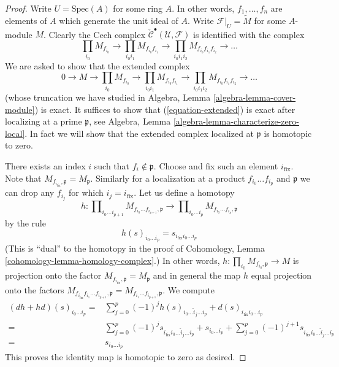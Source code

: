 \begin{proof}
Write $U = \text{Spec}(A)$ for some ring $A$.
In other words, $f_1, \ldots, f_n$ are elements of $A$
which generate the unit ideal of $A$.
Write $\mathcal{F}|_U = \widetilde{M}$ for some $A$-module $M$.
Clearly the Cech complex
$\check{\mathcal{C}}^\bullet(\mathcal{U}, \mathcal{F})$
is identified with the complex
$$
\prod_{i_0} M_{f_{i_0}} \to
\prod_{i_0i_1} M_{f_{i_0}f_{i_1}} \to
\prod_{i_0i_1i_2} M_{f_{i_0}f_{i_1}f_{i_2}} \to
\ldots
$$
We are asked to show that the extended complex
\begin{equation}
\label{equation-extended}
0 \to
M \to
\prod_{i_0} M_{f_{i_0}} \to
\prod_{i_0i_1} M_{f_{i_0}f_{i_1}} \to
\prod_{i_0i_1i_2} M_{f_{i_0}f_{i_1}f_{i_2}} \to
\ldots
\end{equation}
(whose truncation we have studied in
Algebra, Lemma \ref{algebra-lemma-cover-module}) is exact.
It suffices to show that (\ref{equation-extended})
is exact after localizing at a prime $\mathfrak p$, see
Algebra, Lemma \ref{algebra-lemma-characterize-zero-local}.
In fact we will show that the extended complex localized
at $\mathfrak p$ is homotopic to zero.

\medskip\noindent
There exists an index $i$ such that $f_i \not \in \mathfrak p$.
Choose and fix such an element $i_{\text{fix}}$. Note that
$M_{f_{i_{\text{fix}}}, \mathfrak p} = M_{\mathfrak p}$. Similarly
for a localization at a product $f_{i_0} \ldots f_{i_p}$ and $\mathfrak p$
we can drop any $f_{i_j}$ for which $i_j = i_{\text{fix}}$.
Let us define a homotopy
$$
h :
\prod\nolimits_{i_0 \ldots i_{p + 1}}
M_{f_{i_0} \ldots f_{i_{p + 1}}, \mathfrak p}
\longrightarrow
\prod\nolimits_{i_0 \ldots i_p}
M_{f_{i_0} \ldots f_{i_p}, \mathfrak p}
$$
by the rule
$$
h(s)_{i_0 \ldots i_p} = s_{i_{\text{fix}} i_0 \ldots i_p}
$$
(This is ``dual'' to the homotopy in the proof of
Cohomology, Lemma \ref{cohomology-lemma-homology-complex}.)
In other words, $h : \prod_{i_0} M_{f_{i_0}, \mathfrak p} \to M$
is projection onto the factor
$M_{f_{i_{\text{fix}}}, \mathfrak p} = M_{\mathfrak p}$ and in general
the map $h$ equal projection onto the factors
$M_{f_{i_{\text{fix}}} f_{i_1} \ldots f_{i_{p + 1}}, \mathfrak p}
= M_{f_{i_1} \ldots f_{i_{p + 1}}, \mathfrak p}$. We compute
\begin{align*}
(dh + hd)(s)_{i_0 \ldots i_p}
= &
\sum_{j = 0}^p
(-1)^j
h(s)_{i_0 \ldots \hat i_j \ldots i_p}
+
d(s)_{i_{\text{fix}} i_0 \ldots i_p}\\
= &
\sum_{j = 0}^p
(-1)^j
s_{i_{\text{fix}} i_0 \ldots \hat i_j \ldots i_p}
+
s_{i_0 \ldots i_p}
+
\sum_{j = 0}^p
(-1)^{j + 1}
s_{i_{\text{fix}} i_0 \ldots \hat i_j \ldots i_p} \\
= &
s_{i_0 \ldots i_p}
\end{align*}
This proves the identity map is homotopic to zero as desired.
\end{proof}

